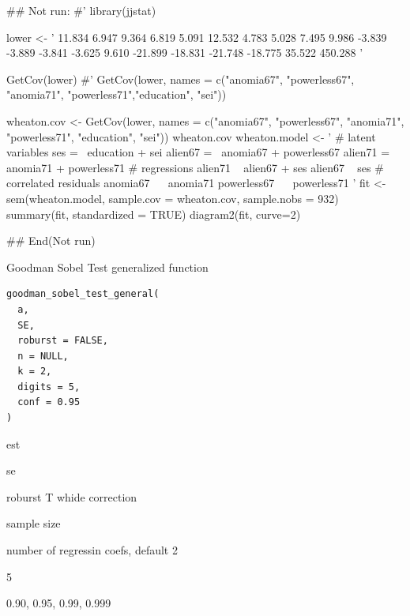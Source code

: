 \documentclass[a4paper]{book}
\begin{document}
\begin{Examples}
\begin{ExampleCode}

## Not run: 
#'
library(jjstat)

lower <- '
 11.834
  6.947   9.364
  6.819   5.091  12.532
  4.783   5.028   7.495   9.986
 -3.839  -3.889  -3.841  -3.625  9.610
-21.899 -18.831 -21.748 -18.775 35.522 450.288 '

GetCov(lower)
#' GetCov(lower, names = c("anomia67", "powerless67", "anomia71", "powerless71","education", "sei"))

wheaton.cov <-
  GetCov(lower, names = c("anomia67", "powerless67",
                          "anomia71", "powerless71",
                          "education", "sei"))
wheaton.cov
wheaton.model <- '
  # latent variables
    ses     =~ education + sei
    alien67 =~ anomia67 + powerless67
    alien71 =~ anomia71 + powerless71
  # regressions
    alien71 ~ alien67 + ses
    alien67 ~ ses
  # correlated residuals
    anomia67 ~~ anomia71
    powerless67 ~~ powerless71
'
fit <- sem(wheaton.model,
           sample.cov = wheaton.cov,
           sample.nobs = 932)
summary(fit, standardized = TRUE)
diagram2(fit, curve=2)

## End(Not run)


\end{ExampleCode}
\end{Examples}
%
\begin{Description}
Goodman Sobel Test generalized function
\end{Description}
%
\begin{Usage}
\begin{verbatim}
goodman_sobel_test_general(
  a,
  SE,
  roburst = FALSE,
  n = NULL,
  k = 2,
  digits = 5,
  conf = 0.95
)
\end{verbatim}
\end{Usage}
%
\begin{Arguments}
\begin{ldescription}
\item[\code{a}] est

\item[\code{SE}] se

\item[\code{roburst}] roburst T whide correction

\item[\code{n}] sample size

\item[\code{k}] number of regressin coefs, default 2

\item[\code{digits}] 5

\item[\code{conf}] 0.90, 0.95, 0.99, 0.999
\end{ldescription}
\end{Arguments}
\end{document}
